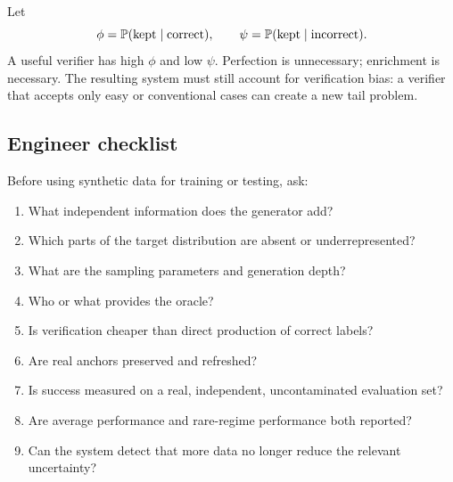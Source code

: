 Let
\[
\phi = \mathbb{P}(\text{kept}\mid\text{correct}),\qquad
\psi = \mathbb{P}(\text{kept}\mid\text{incorrect}).
\]
A useful verifier has high $\phi$ and low $\psi$. Perfection is unnecessary; enrichment is necessary. The resulting system must still account for verification bias: a verifier that accepts only easy or conventional cases can create a new tail problem.

\subsection{Engineer checklist}

Before using synthetic data for training or testing, ask:

\begin{enumerate}[leftmargin=*]
  \item What independent information does the generator add?
  \item Which parts of the target distribution are absent or underrepresented?
  \item What are the sampling parameters and generation depth?
  \item Who or what provides the oracle?
  \item Is verification cheaper than direct production of correct labels?
  \item Are real anchors preserved and refreshed?
  \item Is success measured on a real, independent, uncontaminated evaluation set?
  \item Are average performance and rare-regime performance both reported?
  \item Can the system detect that more data no longer reduce the relevant uncertainty?
\end{enumerate}
